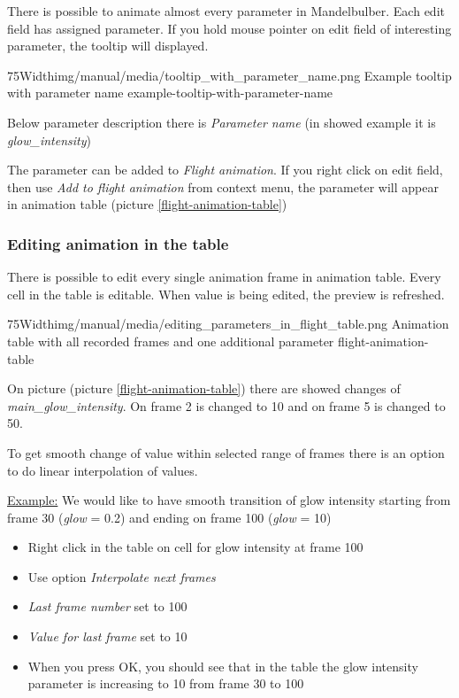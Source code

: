 	There is possible to animate almost every parameter in Mandelbulber. Each edit field has assigned parameter. If you hold mouse pointer on edit field of interesting parameter, the tooltip will displayed. 
	
	\simpleImageWithCaption75Width{img/manual/media/tooltip_with_parameter_name.png}
	{Example tooltip with parameter name}
	{example-tooltip-with-parameter-name}
		
	Below parameter description there is \emph{Parameter name} (in showed example it is \emph{glow\_intensity})
	
	The parameter can be added to \emph{Flight animation}. If you right click on edit field, then use \emph{Add to flight animation} from context menu, the parameter will appear in animation table  (picture \ref{flight-animation-table})
			
	\subsubsection{Editing animation in the table}
	
	There is possible to edit every single animation frame in animation table. Every cell in the table is editable.  When value is being edited, the preview is refreshed.
	
		\simpleImageWithCaption75Width{img/manual/media/editing_parameters_in_flight_table.png}
	{Animation table with all recorded frames and one additional parameter}
	{flight-animation-table}
	
	On picture (picture \ref{flight-animation-table}) there are showed changes of \emph{main\_glow\_intensity}. On frame 2 is changed to 10 and on frame 5 is changed to 50.
	
	To get smooth change of value within selected range of frames there is an option to do linear interpolation of values. 
	
	\underline{Example:} We would like to have smooth transition of glow intensity starting from frame 30 (\emph{glow} = 0.2) and ending on frame 100 (\emph{glow} = 10)
	\begin{itemize}
		\item Right click in the table on cell for glow intensity at frame 100
		\item Use option  \emph{Interpolate next frames}
		\item \emph{Last frame number} set to 100
		\item \emph{Value for last frame} set to 10
		\item When you press OK, you should see that in the table the glow intensity parameter is increasing to 10 from frame 30 to 100
	\end{itemize} 
	
